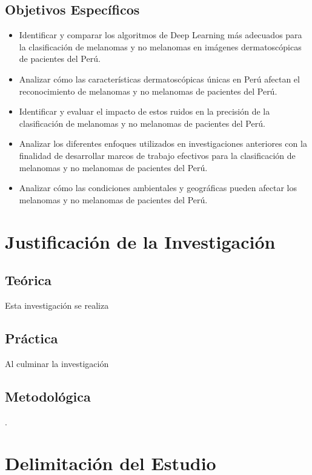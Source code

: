 \subsection{Objetivos Espec\'{i}ficos}
\newcommand{\Objone}{
Identificar y comparar los algoritmos de Deep Learning más adecuados para la clasificación de melanomas y no melanomas en imágenes dermatoscópicas de pacientes del Perú.
}
\newcommand{\Objtwo}{
Analizar cómo las características dermatoscópicas únicas en Perú afectan el reconocimiento de melanomas y no melanomas de pacientes del Perú.
}
\newcommand{\Objthree}{
Identificar y evaluar el impacto de estos ruidos en la precisión de la clasificación de melanomas y no melanomas de pacientes del Perú.
}
\newcommand{\Objfour}{
Analizar los diferentes enfoques utilizados en investigaciones anteriores con la finalidad de desarrollar marcos de trabajo efectivos para la clasificación de melanomas y no melanomas de pacientes del Perú.
}
\newcommand{\Objfive}{
Analizar cómo las condiciones ambientales y geográficas pueden afectar los melanomas y no melanomas de pacientes del Perú.
}

\begin{itemize}
	\item {\Objone}
	\item {\Objtwo}
	\item {\Objthree}
	\item {\Objfour}
	\item {\Objfive}
\end{itemize}

\section{Justificación de la Investigación}

\subsection{Teórica}
Esta investigación se realiza 

\subsection{Práctica}
Al culminar la investigación 

\subsection{Metodológica}. 

\section{Delimitación del Estudio}

